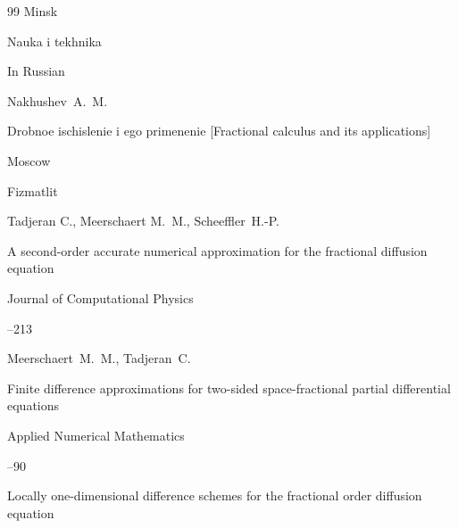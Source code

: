 \begin{thebibliography}{99}
\publaddr Minsk

\publ Nauka i tekhnika






\lang In Russian

\by Nakhushev~A.~M.

\book Drobnoe ischislenie i ego primenenie \rm [Fractional calculus and its applications]

\publaddr Moscow

\publ Fizmatlit 








\by Tadjeran C., Meerschaert M.~M., Scheeffler~H.-P.

\paper A second-order accurate numerical approximation for the fractional diffusion equation

\jour Journal of Computational Physics




--213







\by  Meerschaert~M.~M., Tadjeran~C.

\paper Finite difference approximations for two-sided space-fractional partial differential equations

\jour Applied Numerical Mathematics 




--90









\paper Locally one-dimensional difference schemes for the fractional order diffusion equation


\end{thebibliography}
